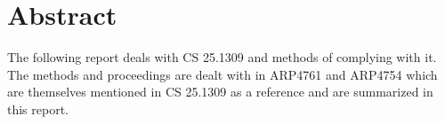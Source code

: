 \chapter*{Abstract}
%
The following report deals with CS 25.1309 and methods of complying with it. The methods and proceedings are dealt with in ARP4761 and ARP4754 which are themselves mentioned in CS 25.1309 as a reference and are summarized in this report. 